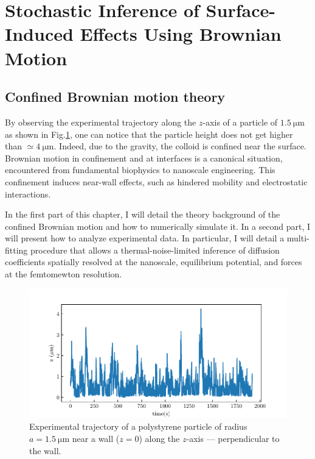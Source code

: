\section{Stochastic Inference of Surface-Induced Effects Using Brownian Motion}

\subsection{Confined Brownian motion theory}

By observing the experimental trajectory along the $z$-axis of a particle of $1.5 ~ \mathrm{\mu m} $ as shown in Fig.\ref{Fig:exp_z_traj}, one can notice that the particle height does not get higher than $ \simeq 4 ~ \mathrm{\mu m}$. Indeed, due to the gravity, the colloid is confined near the surface. Brownian motion in confinement and at interfaces is a canonical situation, encountered from fundamental biophysics to nanoscale  engineering. This confinement induces near-wall effects, such as hindered mobility and electrostatic interactions. 

In the first part of this chapter, I will detail the theory background of the confined Brownian motion and how to numerically simulate it. In a second part, I will present how to analyze experimental data. In particular, I will detail a multi-fitting procedure that allows a thermal-noise-limited inference of diffusion coefficients spatially resolved at the nanoscale, equilibrium potential, and forces at the femtomewton resolution.

\begin{figure}[ht]
	\centering
	\includegraphics{02_body/chapter3/images/traj_z/traj_z.pdf}
	\caption{Experimental trajectory of a polystyrene particle of radius $a = 1.5 ~ \mathrm{\mu m}$ near a wall ($z = 0$) along the $z$-axis --- perpendicular to the wall.}
	\label{Fig:exp_z_traj}
\end{figure}

